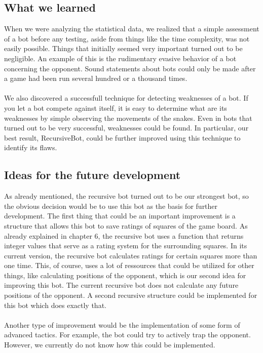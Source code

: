 \documentclass[a4paper,12pt]{article}
\begin{document}
\subsection{What we learned}
When we were analyzing the statistical data, we realized that a simple assessment of a bot before any testing, aside from things like the time complexity, was not easily possible. Things that initially seemed very important turned out to be negligible. An example of this is the rudimentary evasive behavior of a bot concerning the opponent. Sound statements about bots could only be made after a game had been run several hundred or a thousand times. \\
\\We also discovered a successfull technique for detecting weaknesses of a bot. If you let a bot compete against itself, it is easy to determine what are its weaknesses by simple observing the movements of the snakes. Even in bots that turned out to be very successful, weaknesses could be found. In particular, our best result, RecursiveBot, could be further improved using this technique to identify its flaws. 
\\

\subsection{Ideas for the future development}
As already mentioned, the recursive bot turned out to be our strongest bot, so the obvious decision would be to use this bot as the basis for further development. The first thing that could be an important improvement is a structure that allows this bot to save ratings of squares of the game board. As already explained in chapter 6, the recursive bot uses a function that returns integer values that serve as a rating system for the surrounding squares. In its current version, the recursive bot calculates ratings for certain squares more than one time. This, of course, uses a lot of ressources that could be utilized for other things, like calculating positions of the opponent, which is our second idea for improving this bot. The current recursive bot does not calculate any future positions of the opponent. A second recursive structure could be implemented for this bot which does exactly that.\\
\\Another type of improvement would be the implementation of some form of advanced tactics. For example, the bot could try to actively trap the opponent. However, we currently do not know how this could be implemented.

\newpage


\end{document}
